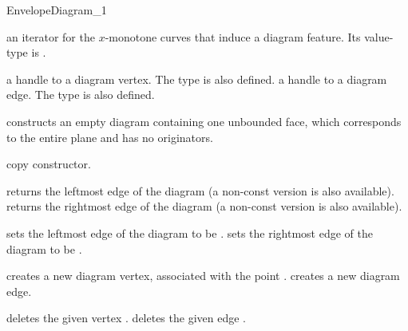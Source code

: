 \begin{ccRefConcept}{EnvelopeDiagram_1}

{an iterator for the $x$-monotone curves that induce a diagram feature.
 Its value-type is .}

\ccGlue
{}

{a handle to a diagram vertex.
 The  type is also defined.}
\ccGlue
{}
{a handle to a diagram edge.
 The  type is also defined.}

\ccCreation
{}

    {constructs an empty diagram containing one unbounded face,
     which corresponds to the entire plane and has no originators.}
    
    {copy constructor.}
        
\ccAccessFunctions

    {returns the leftmost edge of the diagram (a non-const version is also available).}
\ccGlue
{}
    {returns the rightmost edge of the diagram (a non-const version is also available).}

\ccModifiers

    {sets the leftmost edge of the diagram to be .}
\ccGlue
{}
    {sets the rightmost edge of the diagram to be .}

    {creates a new diagram vertex, associated with the point .}
\ccGlue
{}
    {creates a new diagram edge.}
    
    {deletes the given vertex .}
\ccGlue
{}
    {deletes the given edge .}

\ccSeeAlso
     \\
     \\

\end{ccRefConcept}

\ccRefPageEnd

